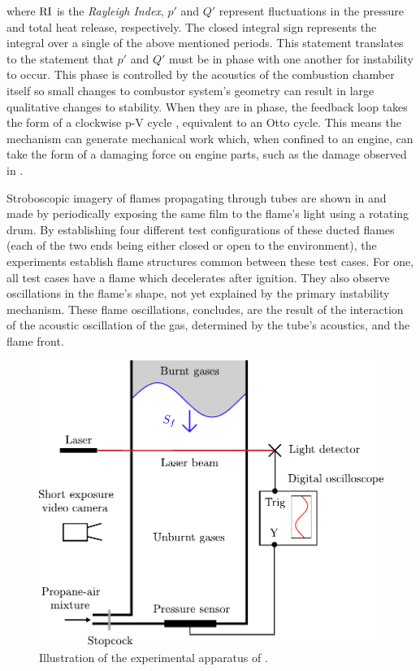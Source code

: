 where $\rm{RI}$ is the \emph{Rayleigh Index}, $p'$ and $Q'$ represent fluctuations in the pressure and total heat release, respectively. The closed integral sign represents the integral over a single of the above mentioned periods. This statement translates to the statement that $p'$ and $Q'$ must be in phase with one another for instability to occur. This phase is controlled by the acoustics of the combustion chamber itself so small changes to combustor system's geometry can result in large qualitative changes to stability. When they are in phase, the feedback loop takes the form of a clockwise p-V cycle \cite{polifke2004CombustionInstabilities}, equivalent to an Otto cycle. This means the mechanism can generate mechanical work which, when confined to an engine, can take the form of a damaging force on engine parts, such as the damage observed in \cite{lieuwen2006CombustionInstabilitiesGas}.

Stroboscopic imagery of flames propagating through tubes are shown in \cite{guenoche1964ChapterFlamePropagation} and made by periodically exposing the same film to the flame's light using a rotating drum. By establishing four different test configurations of these ducted flames (each of the two ends being either closed or open to the environment), the experiments establish flame structures common between these test cases. For one, all test cases have a flame which decelerates after ignition. They also observe oscillations in the flame's shape, not yet explained by the primary instability mechanism. These flame oscillations, \cite{guenoche1964ChapterFlamePropagation} concludes, are the result of the interaction of the acoustic oscillation of the gas, determined by the tube's acoustics, and the flame front.

\begin{figure}[t]
\centering
\includegraphics[scale=0.65]{assets/imgs/Searby-92.pdf}
\caption{Illustration of the experimental apparatus of \cite{searby1992AcousticInstabilityPremixed}.}
\label{fig:searby-experiment}
\end{figure}

